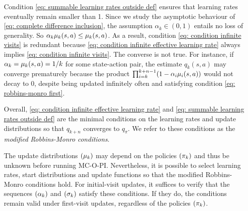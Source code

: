 Condition \eqref{eq: summable learning rates outside def} ensures that learning rates eventually remain smaller than 1. Since we study the asymptotic behaviour of \eqref{eq: complete difference inclusion},
the assumption $\alpha_k \in (0,1)$ entails no loss of generality.
So $\alpha_k \mu_k(s,a) \le \mu_k(s,a)$.
As a result, condition \eqref{eq: condition infinite visits} is redundant because \eqref{eq: condition infinite effective learning rate} always implies \eqref{eq: condition infinite visits}.
The converse is not true.
For instance, if $\alpha_k = \mu_k(s,a) = 1/k$ for some state-action pair, the estimate $q_k(s,a)$ may converge prematurely because the product $\prod_{i=k}^{k+n-1} (1-\alpha_i \mu_i(s,a))$ would not decay to 0,
despite being updated infinitely often and satisfying condition \eqref{eq: robbins-monro first}.

Overall, \eqref{eq: condition infinite effective learning rate} and \eqref{eq: summable learning rates outside def} are the minimal conditions on the learning rates and update distributions so that $q_{k+n}$ converges to $q_\pi$. We refer to these conditions as the \textit{modified Robbins-Monro conditions}.



\vspace{-0.5cm}


The update distributions $(\mu_k)$ may depend on the policies $(\pi_k)$ and thus be unknown before running MC-O-PI.
Nevertheless, it is possible to select learning rates, start distributions and update functions so that the modified Robbins-Monro conditions hold.
For initial-visit updates, it suffices to verify that the sequences $(\alpha_k)$ and $(\sigma_k)$ satisfy these conditions.
If they do, the conditions remain valid under first-visit updates, regardless of the policies $(\pi_k)$.


